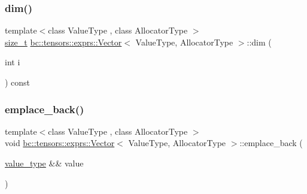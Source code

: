 \mbox{\label{structbc_1_1tensors_1_1exprs_1_1Vector_a15758a965721b43487a91aee601bc794}} 
\subsubsection{\texorpdfstring{dim()}{dim()}}
{\footnotesize\ttfamily template$<$class Value\+Type , class Allocator\+Type $>$ \\
\hyperlink{namespacebc_aaf8e3fbf99b04b1b57c4f80c6f55d3c5}{size\+\_\+t} \hyperlink{structbc_1_1tensors_1_1exprs_1_1Vector}{bc\+::tensors\+::exprs\+::\+Vector}$<$ Value\+Type, Allocator\+Type $>$\+::dim (\begin{DoxyParamCaption}\item[{int}]{i }\end{DoxyParamCaption}) const\hspace{0.3cm}{\ttfamily [inline]}}

\mbox{\label{structbc_1_1tensors_1_1exprs_1_1Vector_a8d4843ec7993bc29a3c35f8af7faccef}} 
\subsubsection{\texorpdfstring{emplace\+\_\+back()}{emplace\_back()}\hspace{0.1cm}{\footnotesize\ttfamily [1/2]}}
{\footnotesize\ttfamily template$<$class Value\+Type , class Allocator\+Type $>$ \\
void \hyperlink{structbc_1_1tensors_1_1exprs_1_1Vector}{bc\+::tensors\+::exprs\+::\+Vector}$<$ Value\+Type, Allocator\+Type $>$\+::emplace\+\_\+back (\begin{DoxyParamCaption}\item[{\hyperlink{structbc_1_1tensors_1_1exprs_1_1Vector_a61ba759af8b26329103ce2b0765dade5}{value\+\_\+type} \&\&}]{value }\end{DoxyParamCaption})\hspace{0.3cm}{\ttfamily [inline]}}

\mbox{\label{structbc_1_1tensors_1_1exprs_1_1Vector_a2e927c004523e23eda06fadc2fa9b836}} 
